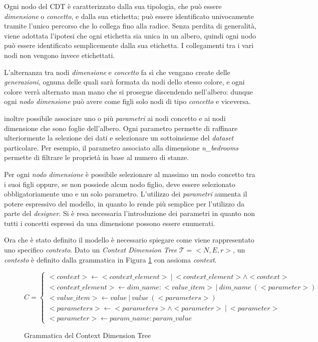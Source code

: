 Ogni nodo del CDT è caratterizzato dalla sua tipologia, che può essere \emph{dimensione} o \emph{concetto}, e dalla sua etichetta; può essere identificato univocamente tramite l'unico percorso che lo collega fino alla radice. Senza perdita di generalità, viene adottata l'ipotesi che ogni etichetta sia unica in un albero, quindi ogni nodo può essere identificato semplicemente dalla sua etichetta. I collegamenti tra i vari nodi non vengono invece etichettati.

L'alternanza tra nodi \emph{dimensione} e \emph{concetto} fa sì che vengano create delle \emph{generazioni}, ognuna delle quali sarà formata da nodi dello stesso colore, e ogni colore verrà alternato man mano che si prosegue discendendo nell'albero: dunque ogni \emph{nodo dimensione} può avere come figli solo nodi di tipo \emph{concetto} e viceversa.

\upe inoltre possibile associare uno o più \emph{parametri} ai nodi concetto e ai nodi dimensione che sono foglie dell'albero. Ogni parametro permette di raffinare ulteriormente la selezione dei dati e selezionare un sottoinsieme del \emph{dataset} particolare. Per esempio, il parametro  associato alla dimensione \emph{n\_bedrooms} permette di filtrare le proprietà in base al numero di stanze.

Per ogni \emph{nodo dimensione} è possibile selezionare al massimo un nodo concetto tra i suoi figli oppure, se non possiede alcun nodo figlio, deve essere selezionato obbligatoriamente uno e un solo parametro. L'utilizzo dei \emph{parametri} aumenta il potere espressivo del modello, in quanto lo rende più semplice per l'utilizzo da parte del \emph{designer}. Si è resa necessaria l'introduzione dei parametri in quanto non tutti i concetti espressi da una dimensione possono essere enumerati.

Ora che è stato definito il modello è necessario spiegare come viene rappresentato uno specifico \emph{contesto}. Dato un \emph{Context Dimension Tree} $\mathcal{T} = {<}N, E, r{>} $, un \emph{contesto} è definito dalla grammatica in Figura \ref{fig:grammatica-cdt} con assioma \emph{context}.

\begin{figure}[ht]
	\begin{equation*}
	C =
	\begin{cases}
		{<}context{>} \leftarrow {<}context\_element{>}\ |\ {<}context\_element{>} \land {<}context{>}\\
		{<}context\_element{>} \leftarrow dim\_name: {<}value\_item{>}\ |\ dim\_name\ ({<}parameter{>})\\
		{<}value\_item{>} \leftarrow value\ |\ value\ ({<}parameters{>})\\
		{<}parameters{>} \leftarrow {<}parameters{>} \land {<}parameter{>}\ |\ {<}parameter{>}\\
		{<}parameter{>} \leftarrow param\_name: param\_value
	\end{cases}
	\end{equation*}
	\caption{Grammatica del Context Dimension Tree}\label{fig:grammatica-cdt}
\end{figure}

